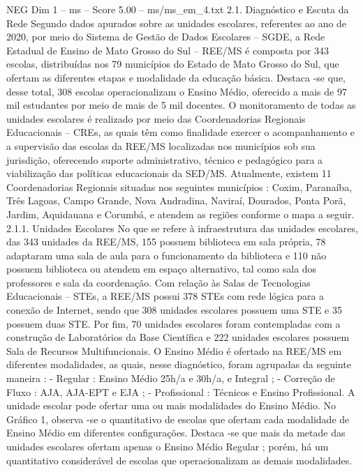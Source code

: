 \begin{textsample}{NEG Dim 1 – ms – Score 5.00 – ms/ms\_em\_4.txt}  \label{ex:f1_neg_106}
2.1.
Diagnóstico e Escuta da Rede Segundo dados apurados sobre as unidades escolares, referentes ao ano de 2020, por meio do Sistema de Gestão de Dados Escolares – SGDE, a Rede Estadual de Ensino de Mato Grosso do Sul – REE/MS é composta por 343 escolas, distribuídas nos 79 municípios do Estado de Mato Grosso do Sul, que ofertam as diferentes etapas e modalidade da educação básica.
Destaca -se que, desse total, 308 escolas operacionalizam o Ensino Médio, oferecido a mais de 97 mil estudantes por meio de mais de 5 mil docentes.
O monitoramento de todas as unidades escolares é realizado por meio das Coordenadorias Regionais Educacionais – CREs, as quais têm como finalidade exercer o acompanhamento e a supervisão das escolas da REE/MS localizadas nos municípios sob sua jurisdição, oferecendo suporte administrativo, técnico e pedagógico para a viabilização das políticas educacionais da SED/MS.
Atualmente, existem 11 Coordenadorias Regionais situadas nos seguintes municípios : Coxim, Paranaíba, Três Lagoas, Campo Grande, Nova Andradina, Naviraí, Dourados, Ponta Porã, Jardim, Aquidauana e Corumbá, e atendem as regiões conforme o mapa a seguir. 2.1.1.
Unidades Escolares No que se refere à infraestrutura das unidades escolares, das 343 unidades da REE/MS, 155 possuem biblioteca em sala própria, 78 adaptaram uma sala de aula para o funcionamento da biblioteca e 110 não possuem biblioteca ou atendem em espaço alternativo, tal como sala dos professores e sala da coordenação.
Com relação às Salas de Tecnologias Educacionais – STEs, a REE/MS possui 378 STEs com rede lógica para a conexão de Internet, sendo que 308 unidades escolares possuem uma STE e 35 possuem duas STE.
Por fim, 70 unidades escolares foram contempladas com a construção de Laboratórios da Base Científica e 222 unidades escolares possuem Sala de Recursos Multifuncionais.
O Ensino Médio é ofertado na REE/MS em diferentes modalidades, as quais, nesse diagnóstico, foram agrupadas da seguinte maneira : - Regular : Ensino Médio 25h/a e 30h/a, e Integral ; - Correção de Fluxo : AJA, AJA-EPT e EJA ; - Profissional : Técnicos e Ensino Profissional.
A unidade escolar pode ofertar uma ou mais modalidades do Ensino Médio.
No Gráfico 1, observa -se o quantitativo de escolas que ofertam cada modalidade de Ensino Médio em diferentes configurações.
Destaca -se que mais da metade das unidades escolares ofertam apenas o Ensino Médio Regular ; porém, há um quantitativo considerável de escolas que operacionalizam as demais modalidades.

\end{textsample}
